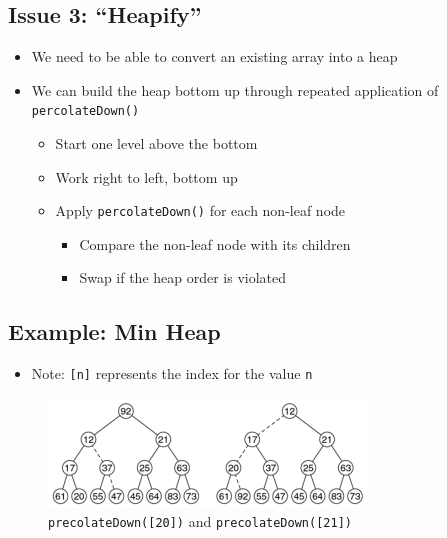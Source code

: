 \documentclass[
  10pt,
  english,
  letterpaper,
,tablecaptionabove
]{scrartcl}
\newcommand{\passthrough}[1]{#1}
\providecommand{\tightlist}{%
  \setlength{\itemsep}{0pt}\setlength{\parskip}{0pt}}
\begin{document}
\hypertarget{issue-3-heapify}{%
\subsection{\texorpdfstring{Issue 3:
\enquote{Heapify}}{Issue 3: ``Heapify''}}\label{issue-3-heapify}}

\begin{itemize}
\tightlist
\item
  We need to be able to convert an existing array into a heap
\item
  We can build the heap bottom up through repeated application of
  \passthrough{\lstinline!percolateDown()!}

  \begin{itemize}
  \tightlist
  \item
    Start one level above the bottom
  \item
    Work right to left, bottom up
  \item
    Apply \passthrough{\lstinline!percolateDown()!} for each non-leaf
    node

    \begin{itemize}
    \tightlist
    \item
      Compare the non-leaf node with its children
    \item
      Swap if the heap order is violated
    \end{itemize}
  \end{itemize}
\end{itemize}

\hypertarget{example-min-heap}{%
\subsection{Example: Min Heap}\label{example-min-heap}}

\begin{itemize}
\tightlist
\item
  Note: \passthrough{\lstinline![n]!} represents the index for the value
  \passthrough{\lstinline!n!}
\end{itemize}

\begin{figure}
\centering
\includegraphics[width=0.75\textwidth,height=\textheight]{images/4.png}
\caption{\passthrough{\lstinline!precolateDown([20])!} and
\passthrough{\lstinline!precolateDown([21])!}}
\end{figure}
\end{document}

